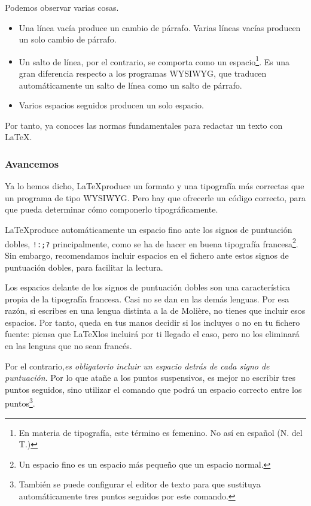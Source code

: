 Podemos observar varias cosas.
\begin{itemize}
\item Una línea vacía produce un cambio de párrafo. Varias líneas vacías producen un solo cambio de párrafo.
\item Un salto de línea, por el contrario, se comporta como un espacio\footnote{En materia de tipografía, este término es femenino. No así en español (N. del T.)}. Es una gran diferencia respecto a los programas WYSIWYG, que traducen automáticamente un salto de línea como un salto de párrafo.
\item Varios espacios seguidos producen un solo espacio. 
\end{itemize}

Por tanto, ya conoces las normas fundamentales para redactar un texto con \LaTeX.

\subsubsection{Avancemos}

Ya lo hemos dicho, \LaTeX produce un formato y una tipografía más correctas que un programa de tipo WYSIWYG. Pero hay que ofrecerle un código correcto, para que pueda determinar cómo componerlo tipográficamente.

\LaTeX produce automáticamente un espacio fino ante los signos de puntuación dobles, \verb|!:;?| principalmente, como se ha de hacer en buena tipografía francesa\footnote{Un espacio fino es un espacio más pequeño que un espacio normal.}. Sin embargo, recomendamos incluir espacios en el fichero  ante estos signos de puntuación dobles, para facilitar la lectura.

\begin{attention}
Los espacios delante de los signos de puntuación dobles son una característica propia de la tipografía francesa. Casi no se dan en las demás lenguas. Por esa razón, si escribes en una lengua distinta a la de Molière, no tienes que incluir esos espacios. Por tanto, queda en tus manos decidir si los incluyes o no en tu fichero fuente: piensa que \LaTeX los incluirá por ti llegado el caso, pero no los eliminará en las lenguas que no sean francés.
\end{attention}

Por el contrario,\emph{es obligatorio incluir un espacio detrás de cada signo de puntuación}. Por lo que atañe a los puntos suspensivos, es mejor no escribir tres puntos seguidos, sino utilizar el comando  que podrá un espacio correcto entre los puntos\footnote{También se puede configurar el editor de texto para que sustituya automáticamente tres puntos seguidos por este comando.}.

